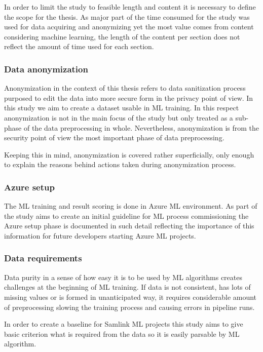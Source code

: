 \documentclass[english, 12pt, a4paper, elec, utf8, a-1b, online]{aaltothesis}
\begin{document}
In order to limit the study
to feasible length and content
it is necessary to define the scope for the thesis.
As major part of the time consumed for the study
was used for data acquiring and anonymizing
yet the most value comes from
content considering machine learning,
the length of the content per section
does not reflect
the amount of time used for each section.

\subsubsection*{Data anonymization}
Anonymization in the context of this thesis
refers to data sanitization process
purposed to edit the data into
more secure form in the privacy point of view.
In this study we aim to
create a dataset usable in ML training.
In this respect
anonymization is not in the main focus of the study
but only treated as a sub-phase
of the data preprocessing in whole.
Nevertheless,
anonymization is from the security point of view
the most important phase of data preprocessing.

Keeping this in mind,
anonymization is covered rather superficially,
only enough to explain the reasons
behind actions taken during anonymization process.

\subsubsection*{Azure setup}
The ML training and result scoring
is done in Azure ML environment.
As part of the study aims to create
an initial guideline for
ML process commissioning
the Azure setup phase is documented in such detail
reflecting the importance of this information
for future developers
starting Azure ML projects.


\subsubsection*{Data requirements}
Data purity in a sense of
how easy it is to be used by ML algorithms
creates challenges at the beginning of ML training.
If data is not consistent,
has lots of missing values
or is formed in unanticipated way,
it requires considerable amount of preprocessing
slowing the training process
and causing errors in pipeline runs.

In order to create a baseline for Samlink ML projects
this study aims to give basic criterion
what is required from the data
so it is easily parsable by ML algorithm.
\end{document}
